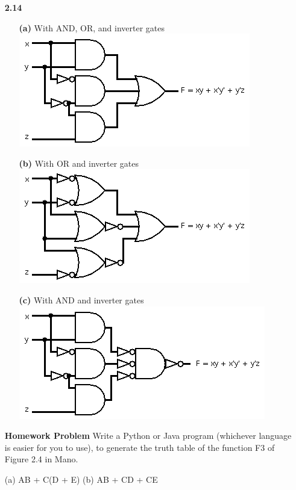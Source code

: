 \documentclass{article}
\begin{document}
\begin{itemize}
	\item [\textbf{2.14}]
	\begin{itemize}
		\item [\textbf{(a)}] With AND, OR, and inverter gates\\
		\includegraphics{214a}
		\item [\textbf{(b)}] With OR and inverter gates\\
		\includegraphics{214b}
		\item [\textbf{(c)}] With AND and inverter gates\\
		\includegraphics{214c}
	\end{itemize}

	\item [\textbf{Homework Problem}] Write a Python or Java program (whichever language is easier for you to use), to generate the truth table of the function F3 of Figure 2.4 in Mano.

	(a) AB + C(D + E) (b) AB + CD + CE

\end{itemize}

	
\end{document}
